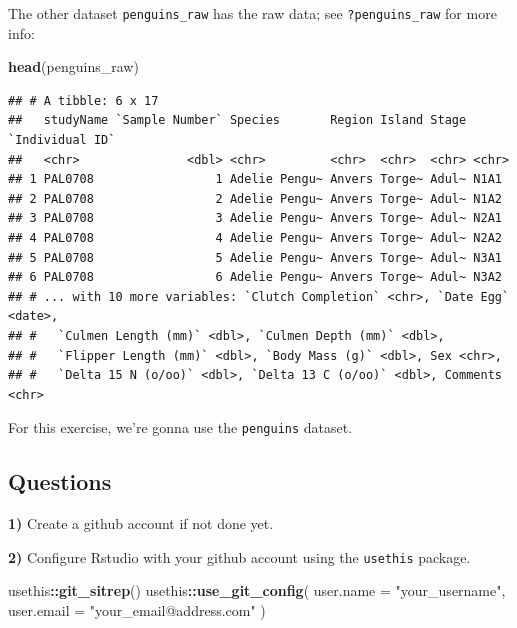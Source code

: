 \documentclass[
  12pt,
]{book}
\newenvironment{Shaded}{\begin{snugshade}}{\end{snugshade}}
\newcommand{\DataTypeTok}[1]{\textcolor[rgb]{0.13,0.29,0.53}{#1}}
\newcommand{\KeywordTok}[1]{\textcolor[rgb]{0.13,0.29,0.53}{\textbf{#1}}}
\newcommand{\NormalTok}[1]{#1}
\newcommand{\OperatorTok}[1]{\textcolor[rgb]{0.81,0.36,0.00}{\textbf{#1}}}
\newcommand{\StringTok}[1]{\textcolor[rgb]{0.31,0.60,0.02}{#1}}
\begin{document}
The other dataset \texttt{penguins\_raw} has the raw data; see \texttt{?penguins\_raw} for more info:

\begin{Shaded}
\begin{Highlighting}[]
\KeywordTok{head}\NormalTok{(penguins\_raw)}
\end{Highlighting}
\end{Shaded}

\begin{verbatim}
## # A tibble: 6 x 17
##   studyName `Sample Number` Species       Region Island Stage `Individual ID`
##   <chr>               <dbl> <chr>         <chr>  <chr>  <chr> <chr>          
## 1 PAL0708                 1 Adelie Pengu~ Anvers Torge~ Adul~ N1A1           
## 2 PAL0708                 2 Adelie Pengu~ Anvers Torge~ Adul~ N1A2           
## 3 PAL0708                 3 Adelie Pengu~ Anvers Torge~ Adul~ N2A1           
## 4 PAL0708                 4 Adelie Pengu~ Anvers Torge~ Adul~ N2A2           
## 5 PAL0708                 5 Adelie Pengu~ Anvers Torge~ Adul~ N3A1           
## 6 PAL0708                 6 Adelie Pengu~ Anvers Torge~ Adul~ N3A2           
## # ... with 10 more variables: `Clutch Completion` <chr>, `Date Egg` <date>,
## #   `Culmen Length (mm)` <dbl>, `Culmen Depth (mm)` <dbl>,
## #   `Flipper Length (mm)` <dbl>, `Body Mass (g)` <dbl>, Sex <chr>,
## #   `Delta 15 N (o/oo)` <dbl>, `Delta 13 C (o/oo)` <dbl>, Comments <chr>
\end{verbatim}

For this exercise, we're gonna use the \texttt{penguins} dataset.

\hypertarget{questions-1}{%
\subsection{Questions}\label{questions-1}}

\textbf{1)} Create a github account if not done yet.

\textbf{2)} Configure Rstudio with your github account using the \texttt{usethis} package.

\begin{Shaded}
\begin{Highlighting}[]
\NormalTok{usethis}\OperatorTok{::}\KeywordTok{git\_sitrep}\NormalTok{()}
\NormalTok{usethis}\OperatorTok{::}\KeywordTok{use\_git\_config}\NormalTok{(}
  \DataTypeTok{user.name =} \StringTok{"your\_username"}\NormalTok{,}
  \DataTypeTok{user.email =} \StringTok{"your\_email@address.com"}
\NormalTok{)}
\end{Highlighting}
\end{Shaded}
\end{document}
